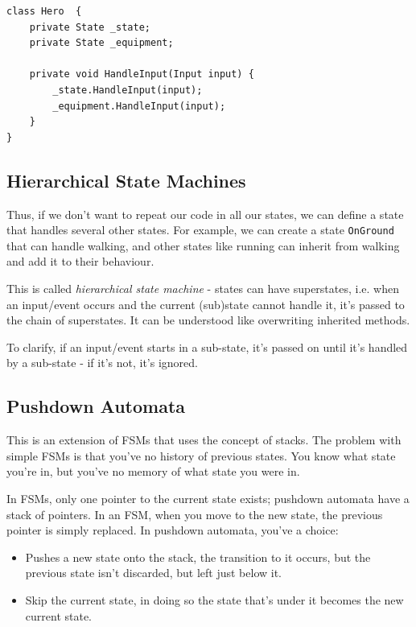 \documentclass[a4paper,12pt,openright]{book}
\begin{document}
\begin{verbatim}
class Hero  {
    private State _state;
    private State _equipment;

    private void HandleInput(Input input) {
        _state.HandleInput(input);
        _equipment.HandleInput(input);
    }
}
\end{verbatim}

\subsection{Hierarchical State Machines}

Thus, if we don't want to repeat our code in all our states, we can define a state that handles several other states. For example, we can create a state \texttt{OnGround} that can handle walking, and other states like running can inherit from walking and add it to their behaviour.

This is called \emph{hierarchical state machine} - states can have superstates, i.e. when an input/event occurs and the current (sub)state cannot handle it, it's passed to the chain of superstates. It can be understood like overwriting inherited methods.

To clarify, if an input/event starts in a sub-state, it's passed on until it's handled by a sub-state - if it's not, it's ignored.

\subsection{Pushdown Automata}

This is an extension of FSMs that uses the concept of stacks. The problem with simple FSMs is that you've no history of previous states. You know what state you're in, but you've no memory of what state you were in.

In FSMs, only one pointer to the current state exists; pushdown automata have a stack of pointers. In an FSM, when you move to the new state, the previous pointer is simply replaced. In pushdown automata, you've a choice:
\begin{itemize} 
    \item Pushes a new state onto the stack, the transition to it occurs, but the previous state isn't discarded, but left just below it. 
    \item Skip the current state, in doing so the state that's under it becomes the new current state.
\end{itemize}
\end{document}
